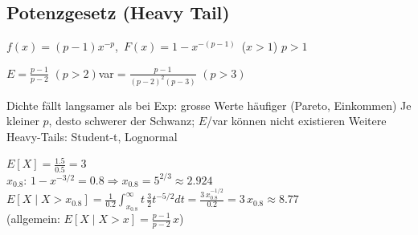\subsection{Potenzgesetz (Heavy Tail)}
\begin{formel}
$f(x)=(p-1)x^{-p}$,\ $F(x)=1-x^{-(p-1)}$\ ($x>1$) \quad $p>1$
\end{formel}
\begin{formel}
$E=\frac{p-1}{p-2}$ $(p>2)$\qquad var$=\frac{p-1}{(p-2)^2(p-3)}$ $(p>3)$
\end{formel}
\begin{itemize}
\pfeil Dichte fällt langsamer als bei Exp: grosse Werte häufiger (Pareto, Einkommen)
\pfeil Je kleiner $p$, desto schwerer der Schwanz; $E$/var können nicht existieren
\pfeil Weitere Heavy-Tails: Student-t, Lognormal
\end{itemize}
\begin{bsp}[{{Einkommen $p=\tfrac52$ (4.2.9)}}]
$E[X]=\frac{1.5}{0.5}=3$\\
$x_{0.8}$: $1-x^{-3/2}=0.8\Rightarrow x_{0.8}=5^{2/3}\approx2.924$\\
$E[X\mid X>x_{0.8}]=\frac{1}{0.2}\int_{x_{0.8}}^\infty t\,\tfrac32t^{-5/2}dt=\frac{3\,x_{0.8}^{-1/2}}{0.2}=3\,x_{0.8}\approx8.77$\\
(allgemein: $E[X\mid X>x]=\frac{p-1}{p-2}\,x$)
\end{bsp}
